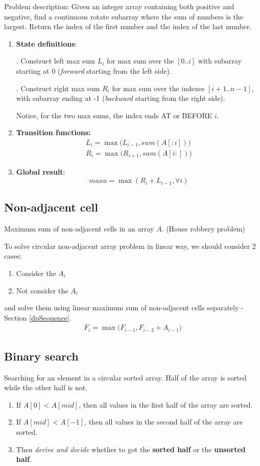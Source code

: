 Problem description: Given an integer array containing both positive and negative, find a continuous rotate subarray where the sum of numbers is the largest. Return the index of the first number and the index of the last number. 
\begin{enumerate}
\item \textbf{State definitions}: 

. Construct left max sum $L_i$ for max sum over the $[0..i]$ with subarray starting at 0 (\textit{forward} starting from the left side). 

. Construct right max sum $R_i$ for max sum over the indexes $[i+1..n -1]$, with subarray ending at -1 (\textit{backward} starting from the right side). 

Notice, for the two max sums, the index ends AT or BEFORE $i$.

\item \textbf{Transition functions:}
\begin{align*}
L_i = \max\Big(L_{i-1}, sum(A[:i])\Big) \\ 
R_i = \max\Big(R_{i+1}, sum(A[i:])\Big)
\end{align*}

\item \textbf{Global result}: 
$$maxa = \max(R_i+L_{i-1}, \forall i)$$
\end{enumerate}

\subsection{Non-adjacent cell}
Maximum sum of non-adjacent cells in an array $A$. (House robbery problem)

To solve circular non-adjacent array problem in linear way, we should consider 2 cases:
\begin{enumerate}
\item Consider the $A_i$
\item Not consider the $A_i$ 
\end{enumerate}
and solve them using linear maximum sum of non-adjacent cells separately - Section \ref{dpSequence}. 
\begin{align*}
F_{i} = \max\big(F_{i-1}, F_{i-2}+A_{i-1}\big)
\end{align*}
\subsection{Binary search}
Searching for an element in a circular sorted array. Half of the array is sorted while the other half is not.
\begin{enumerate}
\item If $A[0] < A[mid]$, then all values in the first half of the array are sorted.
\item If $A[mid] < A[-1]$, then all values in the second half of the array are sorted.
\item Then \textit{derive and decide} whether to got the \textbf{sorted half} or the \textbf{unsorted half}.
\end{enumerate}

